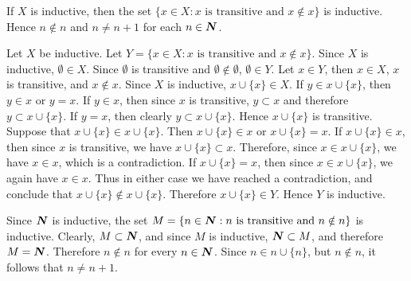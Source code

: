  If $X$ is inductive, then the set
$\{ x \in X : x \text{ is transitive and } x \notin x \}$ is
inductive. Hence $n \notin n$ and $n \neq n + 1$ for each
$n \in \boldsymbol{N}$.
\begin{solution}
  Let $X$ be inductive. Let
  $Y = \{ x \in X : x \text{ is transitive and } x \notin x \}$.
  Since $X$ is inductive, $\emptyset \in X$. Since $\emptyset$ is
  transitive and $\emptyset \notin \emptyset$, $\emptyset \in Y$.
  Let $x \in Y$, then $x \in X$, $x$ is transitive, and 
  $x \notin x$. Since $X$ is inductive, $x \cup \{ x \} \in X$.
  If $y \in x \cup \{ x \}$, then $y \in x$ or $y = x$. If
  $y \in x$, then since $x$ is transitive, $y \subset x$ and
  therefore $y \subset x \cup \{ x \}$. If $y = x$, then clearly
  $ y \subset x \cup \{ x \}$. Hence $x \cup \{ x \}$ is
  transitive. Suppose that $x \cup \{ x \} \in x \cup \{ x \}$.
  Then $x \cup \{ x \} \in x$ or $x \cup \{ x \} = x$. If
  $x \cup \{ x \} \in x$, then since $x$ is transitive, we have
  $x \cup \{ x \} \subset x$. Therefore, since 
  $x \in x \cup \{ x \}$, we have $x \in x$, which is a
  contradiction. If $x \cup \{ x \} = x$, then since
  $x \in x \cup \{ x \}$, we again have $x \in x$. Thus in either
  case we have reached a contradiction, and conclude that
  $x \cup \{ x \} \notin x \cup \{ x \}$. Therefore
  $x \cup \{ x \} \in Y$. Hence $Y$ is inductive.

  Since $\boldsymbol{N}$ is inductive, the set
  $M = \{ n \in \boldsymbol{N} : n \text{ is transitive and } n \notin n \}$
  is inductive. Clearly, $M \subset \boldsymbol{N}$, and since $M$ is
  inductive, $\boldsymbol{N} \subset M$, and therefore $M = \boldsymbol{N}$. Therefore
  $n \notin n$ for every $n \in \boldsymbol{N}$. Since
  $n \in n \cup \{ n \}$, but $n \notin n$, it follows that
  $n \neq n + 1$.
\end{solution}

